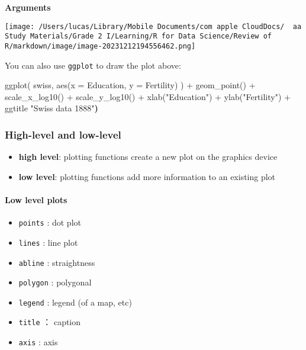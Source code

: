 \documentclass[
]{article}
\let\oldincludegraphics\includegraphics
\renewcommand{\includegraphics}[2][]{\begin{center}\oldincludegraphics[#1]{#2}\end{center}}
\newenvironment{Shaded}{}{}
\newcommand{\AttributeTok}[1]{\textcolor[rgb]{0.49,0.56,0.16}{#1}}
\newcommand{\ErrorTok}[1]{\textcolor[rgb]{1.00,0.00,0.00}{\textbf{#1}}}
\newcommand{\FunctionTok}[1]{\textcolor[rgb]{0.02,0.16,0.49}{#1}}
\newcommand{\NormalTok}[1]{#1}
\newcommand{\SpecialCharTok}[1]{\textcolor[rgb]{0.25,0.44,0.63}{#1}}
\newcommand{\StringTok}[1]{\textcolor[rgb]{0.25,0.44,0.63}{#1}}
\begin{document}
\textbf{Arguments}

\texttt{[image: /Users/lucas/Library/Mobile Documents/com~apple~CloudDocs/~~aa Study Materials/Grade 2 I/Learning/R for Data Science/Review of R/markdown/image/image-20231212194556462.png]}

You can also use \texttt{ggplot} to draw the plot above:

\begin{Shaded}
\begin{Highlighting}[]
\FunctionTok{ggplot}\NormalTok{( }
\NormalTok{  swiss, }
  \FunctionTok{aes}\NormalTok{(}\AttributeTok{x =}\NormalTok{ Education, }\AttributeTok{y =}\NormalTok{ Fertility) }
\NormalTok{) }\SpecialCharTok{+} 
\FunctionTok{geom\_point}\NormalTok{() }\SpecialCharTok{+} 
\FunctionTok{scale\_x\_log10}\NormalTok{() }\SpecialCharTok{+} 
\FunctionTok{scale\_y\_log10}\NormalTok{() }\SpecialCharTok{+} 
\FunctionTok{xlab}\NormalTok{(}\StringTok{"Education"}\NormalTok{) }\SpecialCharTok{+} 
\FunctionTok{ylab}\NormalTok{(}\StringTok{"Fertility"}\NormalTok{) }\SpecialCharTok{+} 
\NormalTok{ggtitle }\StringTok{"Swiss data 1888"}\ErrorTok{)}
\end{Highlighting}
\end{Shaded}

\hypertarget{high-level-and-low-level}{%
\subsubsection{High-level and
low-level}\label{high-level-and-low-level}}

\begin{itemize}
\item
  \textbf{high level}: plotting functions create a new plot on the
  graphics device
\item
  \textbf{low level}: plotting functions add more information to an
  existing plot
\end{itemize}

\hypertarget{low-level-plots}{%
\paragraph{Low level plots}\label{low-level-plots}}

\begin{itemize}
\item
  \texttt{points} : dot plot
\item
  \texttt{lines} : line plot
\item
  \texttt{abline} : straightness
\item
  \texttt{polygon} : polygonal
\item
  \texttt{legend} : legend (of a map, etc)
\item
  \texttt{title} ： caption
\item
  \texttt{axis} : axis
\end{itemize}
\end{document}
